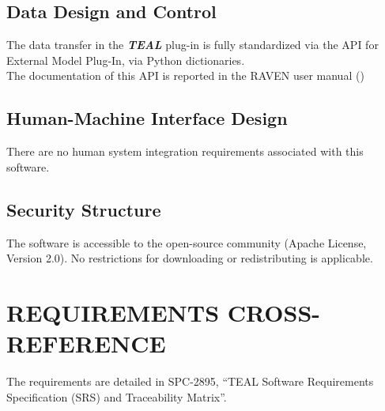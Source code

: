 \subsection{Data Design and Control}
The data transfer in the \textbf{\textit{TEAL}}  plug-in is fully standardized via the API for External Model Plug-In, via
Python dictionaries.
\\The documentation of this  API is reported in the RAVEN user manual (\cite{RAVENuserManual})

\subsection{Human-Machine Interface Design} 
 There are no human system integration requirements associated with this software.

 \subsection{Security Structure} 
The software is accessible to the open-source community (Apache License, Version 2.0). No restrictions for downloading or redistributing is applicable.



 \section{REQUIREMENTS CROSS-REFERENCE} 
The requirements are detailed in SPC-2895, ``TEAL Software Requirements Specification (SRS) and Traceability Matrix''.
